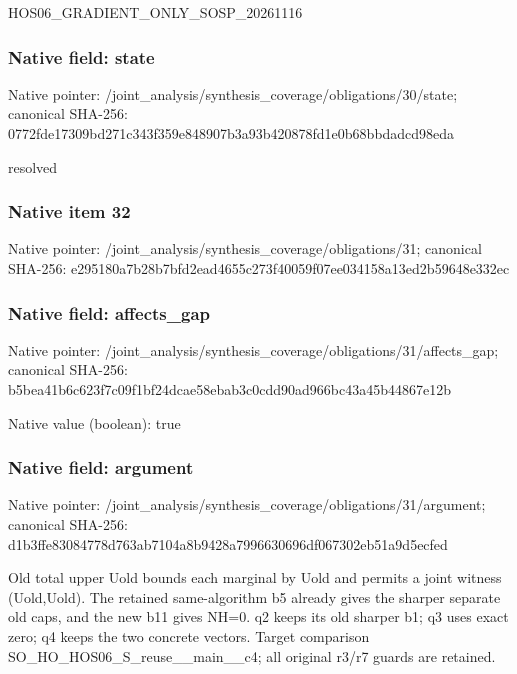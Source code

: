 \documentclass[10pt,a4paper]{article}
\begin{document}
\begingroup\raggedright\sloppy HOS06\_\allowbreak{}GRADIENT\_\allowbreak{}ONLY\_\allowbreak{}SOSP\_\allowbreak{}20261116\par\endgroup

\subsubsection{Native field: state}
Native pointer: /joint\_\allowbreak{}analysis/synthesis\_\allowbreak{}coverage/obligations/30/state; canonical SHA-256: 0772fde17309bd271c343f359e848907b3a93b420878fd1e0b68bbdadcd98eda

\begingroup\raggedright\sloppy resolved\par\endgroup

\subsubsection{Native item 32}
Native pointer: /joint\_\allowbreak{}analysis/synthesis\_\allowbreak{}coverage/obligations/31; canonical SHA-256: e295180a7b28b7bfd2ead4655c273f40059f07ee034158a13ed2b59648e332ec

\subsubsection{Native field: affects\_\allowbreak{}gap}
Native pointer: /joint\_\allowbreak{}analysis/synthesis\_\allowbreak{}coverage/obligations/31/affects\_\allowbreak{}gap; canonical SHA-256: b5bea41b6c623f7c09f1bf24dcae58ebab3c0cdd90ad966bc43a45b44867e12b

Native value (boolean): true

\subsubsection{Native field: argument}
Native pointer: /joint\_\allowbreak{}analysis/synthesis\_\allowbreak{}coverage/obligations/31/argument; canonical SHA-256: d1b3ffe83084778d763ab7104a8b9428a7996630696df067302eb51a9d5ecfed

\begingroup\raggedright\sloppy Old total upper Uold bounds each marginal by Uold and permits a joint witness (Uold,\allowbreak{}Uold). The retained same-algorithm b5 already gives the sharper separate old caps,\allowbreak{} and the new b11 gives NH=\allowbreak{}0. q2 keeps its old sharper b1;\allowbreak{} q3 uses exact zero;\allowbreak{} q4 keeps the two concrete vectors. Target comparison SO\_\allowbreak{}HO\_\allowbreak{}HOS06\_\allowbreak{}S\_\allowbreak{}reuse\_\allowbreak{}\_\allowbreak{}main\_\allowbreak{}\_\allowbreak{}c4;\allowbreak{} all original r3/\allowbreak{}r7 guards are retained.\par\endgroup
\end{document}
